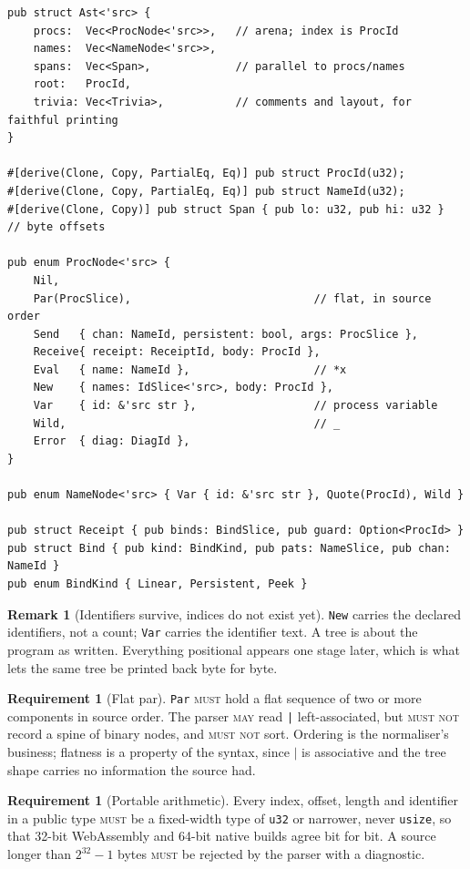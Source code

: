 \documentclass[11pt,a4paper]{article}
\newcommand{\code}[1]{\texttt{#1}}
\newcommand{\MUST}{\textsc{must}}
\newcommand{\MUSTNOT}{\textsc{must not}}
\newcommand{\MAY}{\textsc{may}}
\theoremstyle{definition}
\newtheorem{requirement}[definition]{Requirement}
\newtheorem{remark}[definition]{Remark}
\theoremstyle{plain}
\begin{document}
\begin{lstlisting}
pub struct Ast<'src> {
    procs:  Vec<ProcNode<'src>>,   // arena; index is ProcId
    names:  Vec<NameNode<'src>>,
    spans:  Vec<Span>,             // parallel to procs/names
    root:   ProcId,
    trivia: Vec<Trivia>,           // comments and layout, for faithful printing
}

#[derive(Clone, Copy, PartialEq, Eq)] pub struct ProcId(u32);
#[derive(Clone, Copy, PartialEq, Eq)] pub struct NameId(u32);
#[derive(Clone, Copy)] pub struct Span { pub lo: u32, pub hi: u32 }  // byte offsets

pub enum ProcNode<'src> {
    Nil,
    Par(ProcSlice),                            // flat, in source order
    Send   { chan: NameId, persistent: bool, args: ProcSlice },
    Receive{ receipt: ReceiptId, body: ProcId },
    Eval   { name: NameId },                   // *x
    New    { names: IdSlice<'src>, body: ProcId },
    Var    { id: &'src str },                  // process variable
    Wild,                                      // _
    Error  { diag: DiagId },
}

pub enum NameNode<'src> { Var { id: &'src str }, Quote(ProcId), Wild }

pub struct Receipt { pub binds: BindSlice, pub guard: Option<ProcId> }
pub struct Bind { pub kind: BindKind, pub pats: NameSlice, pub chan: NameId }
pub enum BindKind { Linear, Persistent, Peek }
\end{lstlisting}

\begin{remark}[Identifiers survive, indices do not exist yet]
\code{New} carries the declared identifiers, not a count; \code{Var} carries the
identifier text. A tree is about the program as written. Everything positional
appears one stage later, which is what lets the same tree be printed back byte
for byte.
\end{remark}

\begin{requirement}[Flat par]\label{req:flatpar}
\code{Par} \MUST{} hold a flat sequence of two or more components in source
order. The parser \MAY{} read \code{|} left-associated, but \MUSTNOT{} record a
spine of binary nodes, and \MUSTNOT{} sort. Ordering is the normaliser's
business; flatness is a property of the syntax, since $\code{|}$ is
associative and the tree shape carries no information the source had.
\end{requirement}

\begin{requirement}[Portable arithmetic]\label{req:u32}
Every index, offset, length and identifier in a public type \MUST{} be a
fixed-width type of \code{u32} or narrower, never \code{usize}, so that 32-bit
WebAssembly and 64-bit native builds agree bit for bit. A source longer than
$2^{32}-1$ bytes \MUST{} be rejected by the parser with a diagnostic.
\end{requirement}
\end{document}
